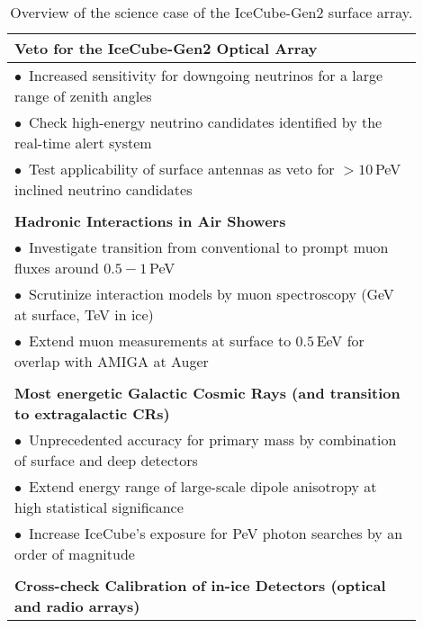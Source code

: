 \documentclass[a4paper,11pt]{article}
\begin{document}
\begin{table}[p]
    \caption{Overview of the science case of the IceCube-Gen2 surface array.}
    \centering
    \begin{tabular}{p{0.9\linewidth}}
        \textbf{Veto for the IceCube-Gen2 Optical Array}\\
        \hline
        \vspace{-0.2cm} $\bullet$\,\,\,Increased sensitivity for downgoing neutrinos for a large range of zenith angles\\
        \vspace{-0.2cm} $\bullet$\,\,\,Check high-energy neutrino candidates identified by the real-time alert system\\
        \vspace{-0.2cm} $\bullet$\,\,\,Test applicability of surface antennas as veto for $>10\,$PeV inclined neutrino candidates\\
        \\
        \textbf{Hadronic Interactions in Air Showers}\\
        \hline
        \vspace{-0.2cm} $\bullet$\,\,\,Investigate transition from conventional to prompt muon fluxes around $0.5 - 1\,$PeV\\
        \vspace{-0.2cm} $\bullet$\,\,\,Scrutinize interaction models by muon spectroscopy (GeV at surface, TeV in ice)\\
        \vspace{-0.2cm} $\bullet$\,\,\,Extend muon measurements at surface to $0.5$\,EeV for overlap with AMIGA at Auger\\
        \\
        \textbf{Most energetic Galactic Cosmic Rays (and transition to extragalactic CRs)}\\
        \hline
        \vspace{-0.2cm} $\bullet$\,\,\,Unprecedented accuracy for primary mass by combination of surface and deep detectors\\
        \vspace{-0.2cm} $\bullet$\,\,\,Extend energy range of large-scale dipole anisotropy at high statistical significance\\
        \vspace{-0.2cm} $\bullet$\,\,\,Increase IceCube's exposure for PeV photon searches by an order of magnitude\\
        \\
        \textbf{Cross-check Calibration of in-ice Detectors (optical and radio arrays)}\\

\end{tabular}
\end{table}
\end{document}
